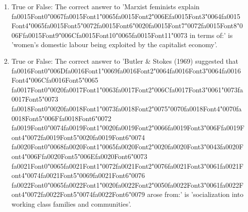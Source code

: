 \documentclass[12pt]{article}
\begin{document}
\begin{enumerate}[label=\arabic*.]
\item True or False: The correct answer to 'Marxist feminists explain {\csname fa0015Font0\endcsname\char"0067}{\csname fa0015Font1\endcsname\char"0065}{\csname fa0015Font2\endcsname\char"006E}{\csname fa0015Font3\endcsname\char"0064}{\csname fa0015Font4\endcsname\char"0065}{\csname fa0015Font5\endcsname\char"0072}{\csname fa0015Font6\endcsname\char"0020}{\csname fa0015Font7\endcsname\char"0072}{\csname fa0015Font8\endcsname\char"006F}{\csname fa0015Font9\endcsname\char"006C}{\csname fa0015Font10\endcsname\char"0065}{\csname fa0015Font11\endcsname\char"0073} in terms of:' is 'women's domestic labour being exploited by the capitalist economy'.
\item True or False: The correct answer to 'Butler \& Stokes (1969) suggested that {\csname fa0016Font0\endcsname\char"006D}{\csname fa0016Font1\endcsname\char"0069}{\csname fa0016Font2\endcsname\char"0064}{\csname fa0016Font3\endcsname\char"0064}{\csname fa0016Font4\endcsname\char"006C}{\csname fa0016Font5\endcsname\char"0065} {\csname fa0017Font0\endcsname\char"0020}{\csname fa0017Font1\endcsname\char"0063}{\csname fa0017Font2\endcsname\char"006C}{\csname fa0017Font3\endcsname\char"0061}{\char"0073}{\csname fa0017Font5\endcsname\char"0073} {\csname fa0018Font0\endcsname\char"0020}{\csname fa0018Font1\endcsname\char"0073}{\csname fa0018Font2\endcsname\char"0075}{\char"0070}{\csname fa0018Font4\endcsname\char"0070}{\csname fa0018Font5\endcsname\char"006F}{\csname fa0018Font6\endcsname\char"0072} {\csname fa0019Font0\endcsname\char"0074}{\csname fa0019Font1\endcsname\char"0020}{\csname fa0019Font2\endcsname\char"0066}{\csname fa0019Font3\endcsname\char"006F}{\csname fa0019Font4\endcsname\char"0072}{\csname fa0019Font5\endcsname\char"0020}{\csname fa0019Font6\endcsname\char"0074} {\csname fa0020Font0\endcsname\char"0068}{\csname fa0020Font1\endcsname\char"0065}{\csname fa0020Font2\endcsname\char"0020}{\csname fa0020Font3\endcsname\char"0043}{\csname fa0020Font4\endcsname\char"006F}{\csname fa0020Font5\endcsname\char"006E}{\csname fa0020Font6\endcsname\char"0073} {\csname fa0021Font0\endcsname\char"0065}{\csname fa0021Font1\endcsname\char"0072}{\csname fa0021Font2\endcsname\char"0076}{\csname fa0021Font3\endcsname\char"0061}{\csname fa0021Font4\endcsname\char"0074}{\csname fa0021Font5\endcsname\char"0069}{\csname fa0021Font6\endcsname\char"0076} {\csname fa0022Font0\endcsname\char"0065}{\csname fa0022Font1\endcsname\char"0020}{\csname fa0022Font2\endcsname\char"0050}{\csname fa0022Font3\endcsname\char"0061}{\csname fa0022Font4\endcsname\char"0072}{\csname fa0022Font5\endcsname\char"0074}{\csname fa0022Font6\endcsname\char"0079} arose from:' is 'socialization into working class families and communities'.

\end{enumerate}
\end{document}
